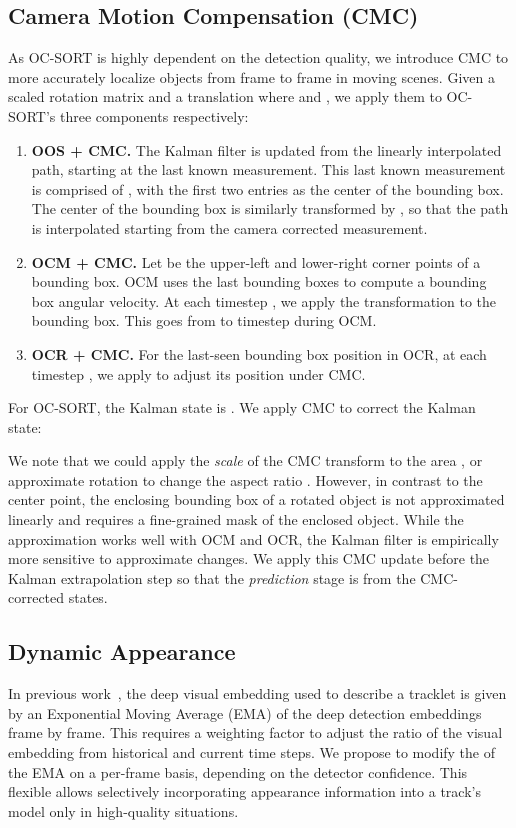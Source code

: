 \documentclass{article}
\begin{document}
\subsection{Camera Motion Compensation (CMC)}
As OC-SORT is highly dependent on the detection quality, we introduce CMC to more accurately localize objects from frame to frame in moving scenes. 
Given a scaled rotation matrix  and a translation  where and ,  we apply them to OC-SORT's three components respectively:
\begin{enumerate}
    \item \textbf{OOS + CMC.} The Kalman filter is updated from the linearly interpolated path, starting at the last known measurement. This last known measurement is comprised of , with the first two entries as the center of the bounding box. The center of the bounding box is similarly transformed by , so that the path is interpolated starting from the camera corrected measurement. 
    \item \textbf{OCM + CMC.} Let  be the upper-left and lower-right corner points of a bounding box. OCM uses the last  bounding boxes to compute a bounding box angular velocity. At each timestep , we apply the transformation   to the bounding box. This goes from  to timestep  during OCM. 
    \item \textbf{OCR + CMC.} For the last-seen bounding box position in OCR, at each timestep , we apply  to adjust its position under CMC.
\end{enumerate}

For OC-SORT, the Kalman state is . We apply CMC to correct the Kalman state:


We note that we could apply the \textit{scale} of the CMC transform to the area , or approximate rotation to change the aspect ratio . However, in contrast to the center point, the enclosing bounding box of a rotated object is not approximated linearly and requires a fine-grained mask of the enclosed object. While the approximation works well with OCM and OCR, the Kalman filter is empirically more sensitive to approximate changes. We apply this CMC update before the Kalman extrapolation step so that the \textit{prediction} stage is from the CMC-corrected states. 

\subsection{Dynamic Appearance} 
In previous work~\cite{botsort, strongsort}, the deep visual embedding used to describe a tracklet is given by an Exponential Moving Average (EMA) of the deep detection embeddings frame by frame. This requires a weighting factor  to adjust the ratio of the visual embedding from historical and current time steps. We propose to modify the  of the EMA on a per-frame basis, depending on the detector confidence. This flexible  allows selectively incorporating appearance information into a track's model only in high-quality situations. 
\end{document}
